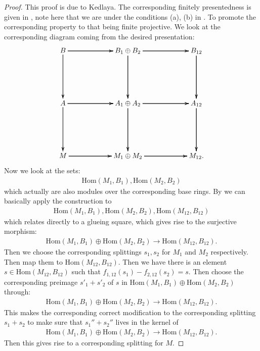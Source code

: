 \documentclass[12pt]{amsart}
\theoremstyle{definition}
\numberwithin{equation}{section}
\begin{document}
\begin{proof}
This proof is due to Kedlaya. The corresponding finitely presentedness is given in \cite[Theorem 1.3.9(a)]{KL1}, note here that we are under the conditions (a), (b) in \cite[Definition 2.7.3 (a),(b)]{KL1}. To promote the corresponding property to that being finite projective. We look at the corresponding diagram coming from the desired presentation:
\[
\xymatrix@R+3pc@C+3pc{
B \ar[r] \ar[r] \ar[r] \ar[d] \ar[d] \ar[d] &B_1\oplus B_2 \ar[r] \ar[r] \ar[r] \ar[d] \ar[d] \ar[d] &B_{12} \ar[d] \ar[d] \ar[d]\\
A \ar[r] \ar[r] \ar[r] \ar[d] \ar[d] \ar[d] &A_1\oplus A_2 \ar[r] \ar[r] \ar[r] \ar[d] \ar[d] \ar[d] &A_{12} \ar[d] \ar[d] \ar[d]\\
M \ar[r] \ar[r] \ar[r]  &M_1\oplus M_2 \ar[r] \ar[r] \ar[r]  &M_{12}. \\
}
\]
Now we look at the sets:
\begin{align}
\mathrm{Hom}(M_1,B_1),\mathrm{Hom}(M_2,B_2)	
\end{align}
which actually are also modules over the corresponding base rings. By \cite[Theorem 1.3.9(a)]{KL1} we can basically apply the construction to 
\begin{align}
\mathrm{Hom}(M_1,B_1),\mathrm{Hom}(M_2,B_2),\mathrm{Hom}(M_{12},B_{12}) 	
\end{align}	
which relates directly to a glueing square, which gives rise to the surjective morphism:
\begin{align}
\mathrm{Hom}(M_1,B_1)\oplus\mathrm{Hom}(M_2,B_2)\rightarrow \mathrm{Hom}(M_{12},B_{12}).	
\end{align}	
Then we choose the corresponding splittings $s_1,s_2$ for $M_1$ and $M_2$ respectively. Then map them to $\mathrm{Hom}(M_{12},B_{12})$. Then we have there is an element $s\in \mathrm{Hom}(M_{12},B_{12})$ such that $f_{1,12}(s_1)-f_{2,12}(s_2)=s$. Then choose the corresponding preimage $s'_1+s'_2$ of $s$ in $\mathrm{Hom}(M_1,B_1)\oplus\mathrm{Hom}(M_2,B_2)$ through:
\begin{align}
\mathrm{Hom}(M_1,B_1)\oplus\mathrm{Hom}(M_2,B_2)\rightarrow \mathrm{Hom}(M_{12},B_{12}).	
\end{align}
This makes the corresponding correct modification to the corresponding splitting $s_1+s_2$ to make sure that $s_1''+s_2''$ lives in the kernel of 
\begin{align}
\mathrm{Hom}(M_1,B_1)\oplus\mathrm{Hom}(M_2,B_2)\rightarrow \mathrm{Hom}(M_{12},B_{12}).	
\end{align}
Then this gives rise to a corresponding splitting for $M$.
\end{proof}
\end{document}
